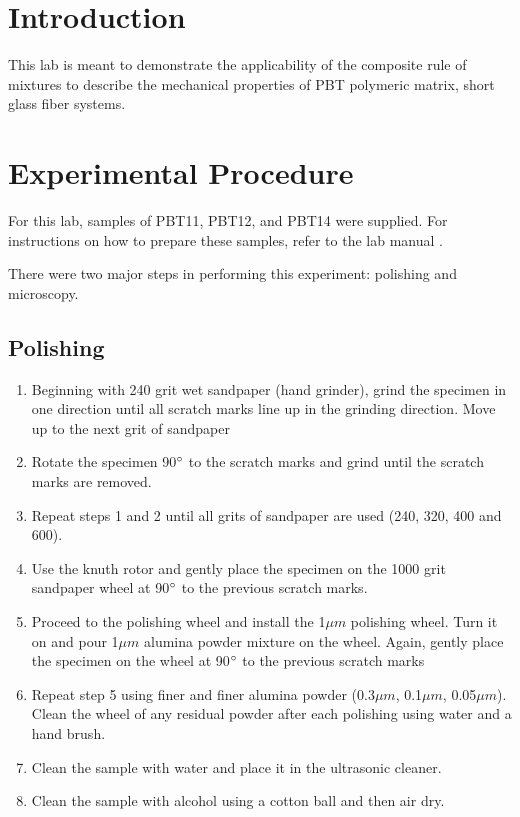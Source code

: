 \documentclass[11pt]{article}
\begin{document}
\tableofcontents
\newpage
\listoffigures
\newpage
\listoftables
\newpage

\section{Introduction}
This lab is meant to demonstrate the applicability of the composite rule of mixtures to describe the mechanical properties of PBT polymeric matrix, short glass fiber systems. 

\section{Experimental Procedure \cite{manual}}
For this lab, samples of PBT11, PBT12, and PBT14 were supplied. For instructions on how to prepare these samples, refer to the lab manual \cite{manual}.

There were two major steps in performing this experiment: polishing and microscopy.

\subsection{Polishing}
\begin{enumerate}
\item Beginning with 240 grit wet sandpaper (hand grinder), grind the specimen in one direction until all scratch marks line up in the grinding direction. Move up to the next grit of sandpaper

\item Rotate the specimen 90\(\degree\) to the scratch marks and grind until the scratch marks are removed.

\item Repeat steps 1 and 2 until all grits of sandpaper are used (240, 320, 400 and 600).

\item Use the knuth rotor and gently place the specimen on the 1000 grit sandpaper wheel at 90\(\degree\) to the previous scratch marks.

\item Proceed to the polishing wheel and install the 1\(\mu m\) polishing wheel. Turn it on and pour 1\(\mu m\) alumina powder mixture on the wheel. Again, gently place the specimen on the wheel at 90\(\degree\) to the previous scratch marks

\item Repeat step 5 using finer and finer alumina powder (0.3\(\mu m\), 0.1\(\mu m\), 0.05\(\mu m\)). Clean the wheel of any residual powder after each polishing using water and a hand brush.

\item Clean the sample with water and place it in the ultrasonic cleaner.

\item Clean the sample with alcohol using a cotton ball and then air dry.
\end{enumerate}
\end{document}
